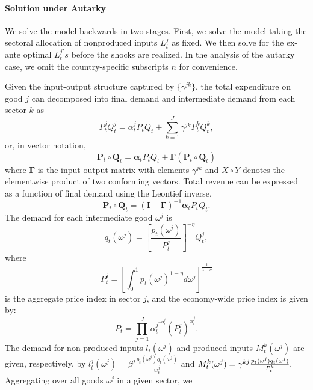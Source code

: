 \documentclass[12pt]{article}
\begin{document}
\paragraph{Solution under Autarky}

We solve the model backwards in two stages. First, we solve the model taking
the sectoral allocation of nonproduced inputs $L_{t}^{j}$ as fixed. We then
solve for the ex-ante optimal $L_{t}^{j\prime }s$ before the shocks are
realized. In the analysis of the autarky case, we omit the country-specific
subscripts $n$ for convenience.

Given the input-output structure captured by $\{\gamma^{jk}\}$, the total expenditure on good $j$ can decomposed into final demand and intermediate demand from each sector $k$ as
\[
P^j_t Q^j_t = \alpha^j_t P_t Q_t
 + \sum_{k=1}^J
 	\gamma^{jk} P^k_t Q^k_t,
\]
or, in vector notation,
\[
\mathbf P_t \circ \mathbf Q_t = \boldsymbol\alpha_t P_t Q_t
 + \boldsymbol\Gamma (\mathbf P_t \circ \mathbf Q_t)
\]
where $\boldsymbol\Gamma$ is the input-output matrix with elements $\gamma^{jk}$ and $X \circ Y$ denotes the elementwise product of two conforming vectors. Total revenue can be expressed as a function of final demand using the Leontief inverse,
\begin{equation}
\mathbf P_t \circ \mathbf Q_t = (\mathbf I - \boldsymbol\Gamma)^{-1}\boldsymbol\alpha_t P_t Q_t.
\label{QJ}
\end{equation}%
The demand for each intermediate good $\omega ^{j}$ is 
\begin{equation*}
q_{t}(\omega ^{j})=\left[ \frac{p_{t}(\omega ^{j})}{P_{t}^{j}}\right]
^{-\eta }Q_{t}^{j},
\end{equation*}%
where 
\begin{equation}
P_{t}^{j}=\left[ \int_{0}^{1}p_{t}(\omega ^{j})^{1-\eta }d\omega ^{j}\right]
^{\frac{1}{1-\eta }}  \label{PJ}
\end{equation}%
is the aggregate price index in sector $j$, and the economy-wide price index
is given by: 
\begin{equation}
P_{t}=\prod_{j=1}^{J}\alpha _{t}^{j^{-\alpha _{t}^{j}}}\left(
P_{t}^{j}\right) ^{\alpha _{t}^{j}}.  \label{Pt}
\end{equation}%
The demand for non-produced inputs $l_{t}(\omega ^{j})$ and produced inputs $%
M_{t}^k(\omega ^{j})$ are given, respectively, by $l_{t}^{j}(\omega
^{j})=\beta ^{j}\frac{p_{t}(\omega ^{j})q_{t}(\omega ^{j})}{w_{t}^{j}}$ and $%
M_{t}^k(\omega ^{j})=\gamma^{kj}\frac{p_{t}(\omega ^{j})q_{t}(\omega ^{j})}{%
P_{t}^k}.$ Aggregating over all goods $\omega ^{j}$ in a given sector, we
\end{document}
